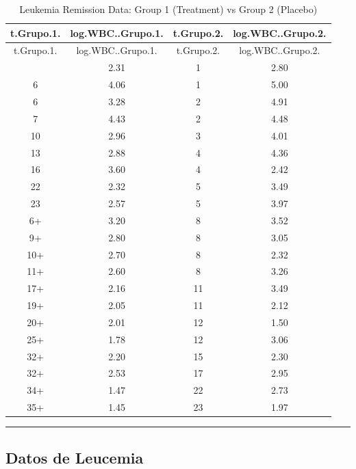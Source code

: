 \documentclass[
]{article}
\begin{document}
\begin{tcolorbox}[enhanced jigsaw, rightrule=.15mm, toprule=.15mm, leftrule=.75mm, opacityback=0, left=2mm, colback=white, colframe=quarto-callout-note-color-frame, arc=.35mm, bottomrule=.15mm, breakable]

\begin{longtable}[]{@{}cccc@{}}
\caption{Leukemia Remission Data: Group 1 (Treatment) vs Group 2
(Placebo)}\tabularnewline
\toprule\noalign{}
t.Grupo.1. & log.WBC..Grupo.1. & t.Grupo.2. & log.WBC..Grupo.2. \\
\midrule\noalign{}
\endfirsthead
\toprule\noalign{}
t.Grupo.1. & log.WBC..Grupo.1. & t.Grupo.2. & log.WBC..Grupo.2. \\
\midrule\noalign{}
\endhead
\bottomrule\noalign{}
\endlastfoot
6 & 2.31 & 1 & 2.80 \\
6 & 4.06 & 1 & 5.00 \\
6 & 3.28 & 2 & 4.91 \\
7 & 4.43 & 2 & 4.48 \\
10 & 2.96 & 3 & 4.01 \\
13 & 2.88 & 4 & 4.36 \\
16 & 3.60 & 4 & 2.42 \\
22 & 2.32 & 5 & 3.49 \\
23 & 2.57 & 5 & 3.97 \\
6+ & 3.20 & 8 & 3.52 \\
9+ & 2.80 & 8 & 3.05 \\
10+ & 2.70 & 8 & 2.32 \\
11+ & 2.60 & 8 & 3.26 \\
17+ & 2.16 & 11 & 3.49 \\
19+ & 2.05 & 11 & 2.12 \\
20+ & 2.01 & 12 & 1.50 \\
25+ & 1.78 & 12 & 3.06 \\
32+ & 2.20 & 15 & 2.30 \\
32+ & 2.53 & 17 & 2.95 \\
34+ & 1.47 & 22 & 2.73 \\
35+ & 1.45 & 23 & 1.97 \\
\end{longtable}

\end{tcolorbox}

\begin{center}\rule{0.5\linewidth}{0.5pt}\end{center}

\subsection{Datos de Leucemia}\label{datos-de-leucemia}
\end{document}
